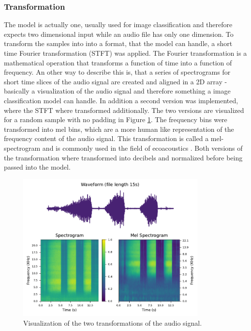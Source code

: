 \subsubsection{Transformation}
The model is actually one, usually used for image classification and therefore expects
two dimensional input while an audio file has only one dimension. To transform the samples into
into a format, that the model can handle, a short time Fourier transformation  (STFT) was applied.
The Fourier transformation is a mathematical operation that transforms a function of time
into a function of frequency. An other way to describe this is, that a series of spectrograms
for short time slices of the audio signal are created and aligned in a 2D array - basically
a visualization of the audio signal and therefore something a image classification model can handle.
In addition a second version was implemented, where the STFT where transformed additionally.
The two versions are visualized for a random sample with no padding in Figure \ref{fig:transformations}.
The frequency bins were transformed into mel bins, which are a more human like representation
of the frequency content of the audio signal. This transformation is called a mel-spectrogram
and is commonly used in the field of ecoacoustics \autocite[7]{stowellComputationalBioacousticsDeep2022}.
Both versions of the transformation where transformed into decibels and normalized before 
being passed into the model.

\begin{figure}[h!]
    \centering
    \captionsetup{width=.7\linewidth}
    \includegraphics[width=0.85\textwidth]{figures/compare_spectrogram.pdf}
    \caption{Visualization of the two transformations of the audio signal.}
    \label{fig:transformations}
\end{figure}

